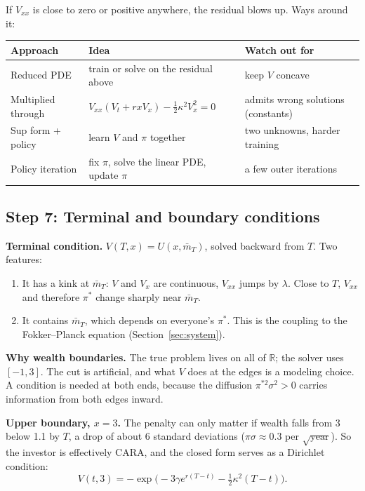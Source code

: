 \documentclass[11pt]{article}
\newcommand{\mb}{\bar m}
\begin{document}
\begin{caution}
If $V_{xx}$ is close to zero or positive anywhere, the residual blows up. Ways around it:
\begin{center}
\small
\begin{tabular}{@{}lll@{}}
\toprule
Approach & Idea & Watch out for \\
\midrule
Reduced PDE & train or solve on the residual above & keep $V$ concave \\
Multiplied through & $V_{xx}(V_t+rxV_x)-\tfrac12\kappa^2V_x^2=0$ & admits wrong solutions (constants) \\
Sup form + policy & learn $V$ and $\pi$ together & two unknowns, harder training \\
Policy iteration & fix $\pi$, solve the linear PDE, update $\pi$ & a few outer iterations \\
\bottomrule
\end{tabular}
\end{center}
\end{caution}

\subsection*{Step 7: Terminal and boundary conditions}

\textbf{Terminal condition.} $V(T,x)=U(x,\mb_T)$, solved backward from $T$. Two features:
\begin{enumerate}
  \item It has a kink at $\mb_T$: $V$ and $V_x$ are continuous, $V_{xx}$ jumps by $\lambda$.
        Close to $T$, $V_{xx}$ and therefore $\pi^*$ change sharply near $\mb_T$.
  \item It contains $\mb_T$, which depends on everyone's $\pi^*$. This is the coupling to the
        Fokker--Planck equation (Section~\ref{sec:system}).
\end{enumerate}

\textbf{Why wealth boundaries.} The true problem lives on all of $\mathbb R$; the solver uses
$[-1,3]$. The cut is artificial, and what $V$ does at the edges is a modeling choice. A
condition is needed at both ends, because the diffusion $\pi^{*2}\sigma^2>0$ carries
information from both edges inward.

\textbf{Upper boundary, $x=3$.} The penalty can only matter if wealth falls from 3 below 1.1
by $T$, a drop of about 6 standard deviations ($\pi\sigma\approx0.3$ per $\sqrt{\text{year}}$).
So the investor is effectively CARA, and the closed form serves as a Dirichlet condition:
\[
  V(t,3) = -\exp\!\bigl(-3\gamma e^{r(T-t)} - \tfrac12\kappa^2(T-t)\bigr).
\]
\end{document}

